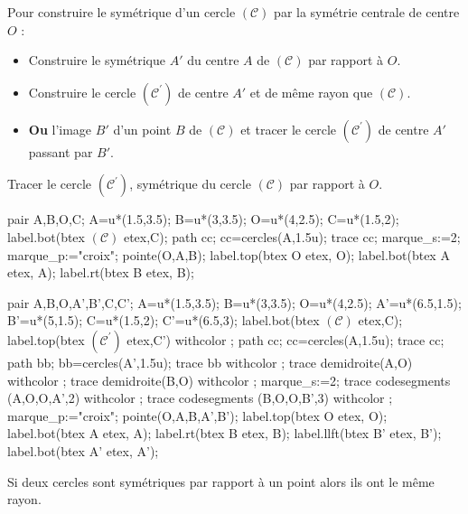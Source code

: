 \begin{methode}
    Pour construire le symétrique d'un cercle $(\mathcal{C})$ par la symétrie centrale de centre $O$ :
    \begin{itemize}
        \item Construire le symétrique $A'$ du centre $A$ de $(\mathcal{C})$ par rapport à $O$.
        \item Construire le cercle $(\mathcal{C}^{'})$ de centre $A'$ et de même rayon que $(\mathcal{C})$.
        \item {\bfseries Ou} l'image $B'$ d'un point $B$ de $(\mathcal{C})$ et tracer le cercle $(\mathcal{C}^{'})$ de centre $A'$ passant par $B'$.
    \end{itemize}
    \exercice
    Tracer le cercle $(\mathcal{C}^{'})$, symétrique du cercle $(\mathcal{C})$ par rapport à $O$.
    
    \bigskip
    \begin{Geometrie}[CoinHD={(8u,5u)}]
        pair A,B,O,C;
        A=u*(1.5,3.5);
        B=u*(3,3.5);
        O=u*(4,2.5);
        C=u*(1.5,2);
        label.bot(btex $({\mathcal C})$ etex,C);        
        path cc;
        cc=cercles(A,1.5u);
        trace cc;
        marque_s:=2;
        marque_p:="croix";
        pointe(O,A,B);
        label.top(btex O etex, O);
        label.bot(btex A etex, A);
        label.rt(btex B etex, B);
    \end{Geometrie}
    \correction
    \begin{Geometrie}[CoinHD={(8u,5u)}]
        pair A,B,O,A',B',C,C';
        A=u*(1.5,3.5);
        B=u*(3,3.5);
        O=u*(4,2.5);
        A'=u*(6.5,1.5);
        B'=u*(5,1.5);
        C=u*(1.5,2);
        C'=u*(6.5,3);
        label.bot(btex $({\mathcal C})$ etex,C);
        label.top(btex $({\mathcal C}^{'})$ etex,C') withcolor \myMetapostGreen;
        path cc;
        cc=cercles(A,1.5u);
        trace cc;
        path bb;
        bb=cercles(A',1.5u);
        trace bb withcolor \myMetapostGreen;
        trace demidroite(A,O) withcolor \myMetapostGreen;
        trace demidroite(B,O) withcolor \myMetapostGreen;
        marque_s:=2;
        trace codesegments (A,O,O,A',2) withcolor \myMetapostGreen;
        trace codesegments (B,O,O,B',3) withcolor \myMetapostGreen;
        marque_p:="croix";
        pointe(O,A,B,A',B');
        label.top(btex O etex, O);
        label.bot(btex A etex, A);
        label.rt(btex B etex, B);
        label.llft(btex B' etex, B');
        label.bot(btex A' etex, A'); 
    \end{Geometrie}
\end{methode}

\begin{propriete}[\admise]
    Si deux cercles sont symétriques par rapport à un point alors ils ont le même rayon.
\end{propriete}